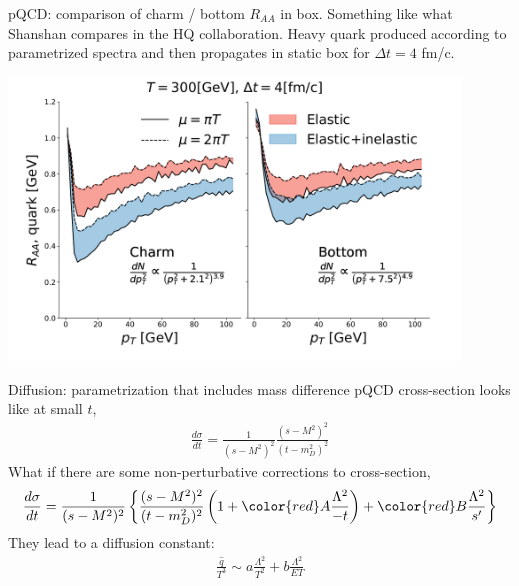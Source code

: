 \documentclass[11pt]{beamer}
\begin{document}
\begin{frame}{pQCD: comparison of charm / bottom $R_{AA}$ in box.}
Something like what Shanshan compares in the HQ collaboration. Heavy quark produced according to parametrized spectra and then propagates in static box for $\Delta t = 4$ fm/c. 
\begin{center}
\includegraphics[width=0.9\textwidth]{fig/compare-plot/Box_Raa.pdf}
\end{center}
\end{frame}

\begin{frame}{Diffusion: parametrization that includes mass difference}
pQCD cross-section looks like at small $t$,
\begin{eqnarray}
\nonumber
\frac{d\sigma}{dt} = \frac{1}{(s-M^2)^2} \frac{(s-M^2)^2}{(t-m_D^2)^2}
\end{eqnarray}
What if there are some non-perturbative corrections to cross-section,
\begin{eqnarray}
\nonumber
\frac{d\sigma}{dt} = \frac{1}{(s-M^2)^2} \left\{ \frac{(s-M^2)^2}{(t-m_D^2)^2}\left(1 + {\color{red}A\frac{\Lambda^2}{-t}}\right) + {\color{red} B\frac{\Lambda^2}{s'}} \right\}
\end{eqnarray}
They lead to a diffusion constant:
\begin{eqnarray}
\nonumber
\frac{\hat{q}}{T^3} \sim  a\frac{\Lambda^2}{T^2} + b\frac{\Lambda^2}{ET}
\end{eqnarray}
\end{frame}
\end{document}
